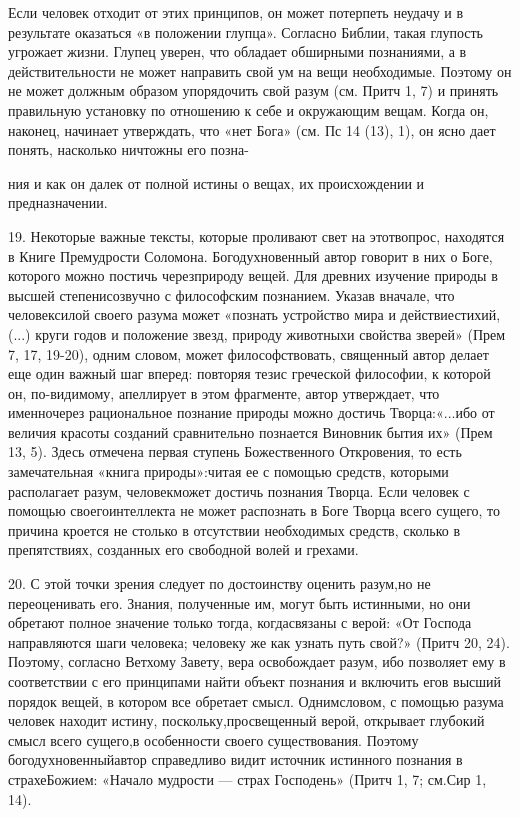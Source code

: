 \documentclass[a5paper,10pt]{article}
\begin{document}
Если человек отходит от этих принципов, он может потерпеть неудачу и в
результате оказаться «в положении глупца». Согласно Библии, такая глупость
угрожает жизни. Глупец уверен, что обладает обширными познаниями, а в
действительности не может направить свой ум на вещи необходимые. Поэтому он не
может должным образом упорядочить свой разум (см. Притч 1, 7) и принять
правильную установку по отношению к себе и окружающим вещам. Когда он, наконец,
начинает утверждать, что «нет Бога» (см. Пс 14 (13), 1), он ясно дает понять,
насколько ничтожны его позна-

ния и как он далек от полной истины о вещах, их происхождении и предназначении.

19. Некоторые важные тексты, которые проливают свет на этотвопрос, находятся в
Книге Премудрости Соломона. Богодухновенный автор говорит в них о Боге,
которого можно постичь черезприроду вещей. Для древних изучение природы в
высшей степенисозвучно с философским познанием. Указав вначале, что
человексилой своего разума может «познать устройство мира и действиестихий,
(...) круги годов и положение звезд, природу животныхи свойства зверей» (Прем
7, 17, 19-20), одним словом, может философствовать, священный автор делает еще
один важный шаг вперед: повторяя тезис греческой философии, к которой он,
по-видимому, апеллирует в этом фрагменте, автор утверждает, что именночерез
рациональное познание природы можно достичь Творца:«...ибо от величия красоты
созданий сравнительно познается Виновник бытия их» (Прем 13, 5). Здесь отмечена
первая ступень Божественного Откровения, то есть замечательная «книга
природы»:читая ее с помощью средств, которыми располагает разум, человекможет
достичь познания Творца. Если человек с помощью своегоинтеллекта не может
распознать в Боге Творца всего сущего, то причина кроется не столько в
отсутствии необходимых средств, сколько в препятствиях, созданных его свободной
волей и грехами.

20. С этой точки зрения следует по достоинству оценить разум,но не
переоценивать его. Знания, полученные им, могут быть истинными, но они обретают
полное значение только тогда, когдасвязаны с верой: «От Господа направляются
шаги человека; человеку же как узнать путь свой?» (Притч 20, 24). Поэтому,
согласно Ветхому Завету, вера освобождает разум, ибо позволяет ему в
соответствии с его принципами найти объект познания и включить егов высший
порядок вещей, в котором все обретает смысл. Однимсловом, с помощью разума
человек находит истину, поскольку,просвещенный верой, открывает глубокий смысл
всего сущего,в особенности своего существования. Поэтому богодухновенныйавтор
справедливо видит источник истинного познания в страхеБожием: «Начало мудрости
— страх Господень» (Притч 1, 7; см.Сир 1, 14).
\end{document}
